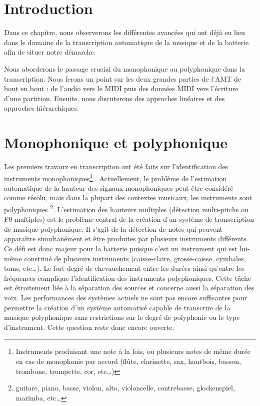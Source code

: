 \section*{Introduction}
Dans ce chapitre, nous 
observerons les différentes avancées qui ont déjà eu lieu dans le domaine de la
transcription automatique de la musique et de la batterie afin de situer notre
démarche.

Nous aborderons le passage crucial du monophonique au polyphonique dans la
transcription. Nous ferons un point sur les deux grandes parties de l’AMT de
bout en bout : de l’audio vers le MIDI puis des données MIDI vers l’écriture
d’une partition. Ensuite, nous discuterons des approches linéaires et des
approches hiérarchiques.

\section{Monophonique et polyphonique}
Les premiers travaux en transcription ont été faits sur l’identification des
instruments monophoniques\footnote{Instruments produisant une note à la fois,
ou plusieurs notes de même durée en cas de monophonie par accord (flûte,
clarinette, sax, hautbois, basson, trombone, trompette, cor, etc…)}
\cite{future_directions}. Actuellement, le problème de l'estimation automatique
de la hauteur des signaux monophoniques peut être considéré comme résolu, mais
dans la plupart des contextes musicaux, les instruments sont polyphoniques
\footnote{guitare, piano, basse, violon, alto, violoncelle, contrebasse,
glockenspiel, marimba, etc…}. L'estimation des hauteurs multiples (détection
multi-pitchs ou F0 multiples) est le problème central de la création d'un
système de transcription de musique polyphonique. Il s’agit de la détection de
notes qui peuvent apparaître simultanément et être produites par plusieurs
instruments différents. Ce défi est donc majeur pour la batterie puisque c’est
un instrument qui est lui-même constitué de plusieurs instruments
(caisse-claire, grosse-caisse, cymbales, toms, etc…). Le fort degré de
chevauchement entre les durées ainsi qu’entre les fréquences complique
l’identification des instruments polyphoniques. Cette tâche est étroitement
liée à la séparation des sources et concerne aussi la séparation des voix. Les
performances des systèmes actuels ne sont pas encore suffisantes pour permettre
la création d'un système automatisé capable de transcrire de la musique
polyphonique sans restrictions sur le degré de polyphonie ou le type
d'instrument. Cette question reste donc encore ouverte. 

